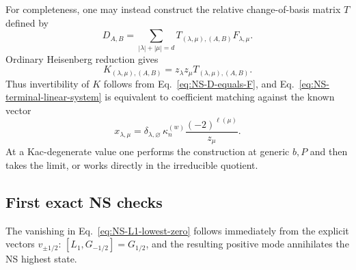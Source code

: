 \documentclass[11pt]{article}
\begin{document}
For completeness, one may instead construct the relative change-of-basis
matrix \(T\) defined by
\begin{equation}
 D_{A,B}
 =\sum_{|\lambda|+|\mu|=d}
 T_{(\lambda,\mu),(A,B)}F_{\lambda,\mu}.
 \label{eq:NS-relative-transition-matrix}
\end{equation}
Ordinary Heisenberg reduction gives
\begin{equation}
 K_{(\lambda,\mu),(A,B)}
 =z_\lambda z_\mu
  T_{(\lambda,\mu),(A,B)}.
 \label{eq:NS-K-versus-T}
\end{equation}
Thus invertibility of \(K\) follows from
Eq.~\eqref{eq:NS-D-equals-F}, and Eq.~\eqref{eq:NS-terminal-linear-system}
is equivalent to coefficient matching against the known vector
\begin{equation}
 x_{\lambda,\mu}
 =\delta_{\lambda,\varnothing}\,
  \kappa_n^{(w)}\frac{(-2)^{\ell(\mu)}}{z_\mu}.
\end{equation}
At a Kac-degenerate value one performs the construction at generic \(b,P\)
and then takes the limit, or works directly in the irreducible quotient.

\subsection{First exact NS checks}

The vanishing in Eq.~\eqref{eq:NS-L1-lowest-zero} follows immediately from
the explicit vectors \(v_{\pm1/2}\):
\([L_1,G_{-1/2}]=G_{1/2}\), and the resulting positive mode annihilates the
NS highest state.
\end{document}
